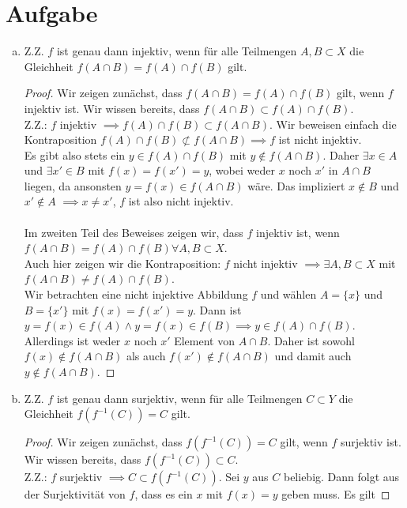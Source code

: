 \documentclass{article}
\begin{document}
\section{Aufgabe}
\begin{enumerate}[a)]
	\item Z.Z. $f$ ist genau dann injektiv, wenn für alle Teilmengen $A, B \subset X$ die Gleichheit $f (A \cap B) = f (A) \cap f (B)$ gilt.
	\begin{proof}
		Wir zeigen zunächst, dass $f (A \cap B) = f (A) \cap f (B)$ gilt, wenn $f$ injektiv ist. Wir wissen bereits, dass $f(A\cap B) \subset f(A)\cap f(B)$.\\
		Z.Z.: $f$ injektiv $\implies f(A)\cap f(B)\subset f(A\cap B)$. Wir beweisen einfach die Kontraposition $f(A)\cap f(B)\not \subset f(A\cap B) \implies f$ ist nicht injektiv.\\
		Es gibt also stets ein $y \in f(A)\cap f(B)$ mit $y \notin f(A\cap B)$. Daher $\exists x \in A$ und $\exists x'\in B$ mit $f(x) = f(x') = y$, wobei weder $x$ noch $x'$ in $A\cap B$ liegen, da ansonsten $y = f(x) \in f(A\cap B)$ wäre. Das impliziert $x\notin B$ und $x'\notin A$ $\implies x \neq x'$, $f$ ist also nicht injektiv.\\\ \\
		Im zweiten Teil des Beweises zeigen wir, dass $f$ injektiv ist, wenn $f (A \cap B) = f (A) \cap f (B) \forall A,B\subset X$.\\
		Auch hier zeigen wir die Kontraposition: $f$ nicht injektiv $\implies \exists A, B \subset X$ mit $f (A \cap B) \neq f (A) \cap f (B)$.\\
		Wir betrachten eine nicht injektive Abbildung $f$ und wählen $A = \{x\}$ und $B = \{x'\}$ mit $f(x) = f(x') = y$.
		Dann ist $y = f(x) \in f(A) \land y= f(x) \in f(B) \implies y \in f(A)\cap f(B)$.
		Allerdings ist weder $x$ noch $x'$ Element von $A\cap B$. Daher ist sowohl $f(x) \notin f(A\cap B)$  als auch $f(x')\notin f(A\cap B)$ und damit auch $y \notin f(A\cap B)$.
	\end{proof}
	\item Z.Z. $f$ ist genau dann surjektiv, wenn für alle Teilmengen $C \subset Y$ die Gleichheit $f(f^{-1}(C)) = C$ gilt.
	\begin{proof}
		Wir zeigen zunächst, dass $f(f^{-1}(C)) = C$ gilt, wenn $f$ surjektiv ist. Wir wissen bereits, dass $f(f^{-1}(C)) \subset C$.\\
		Z.Z.: $f$ surjektiv $\implies C \subset f(f^{-1}(C))$. 
		Sei $y$ aus $C$ beliebig. Dann folgt aus der Surjektivität von $f$, dass es ein $x$ mit $f(x) = y$ geben muss. Es gilt

\end{proof}
\end{enumerate}
\end{document}
